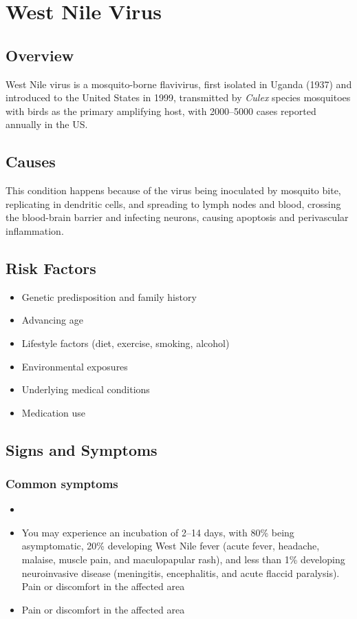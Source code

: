 \chapter{West Nile Virus}
\label{sec:West Nile Virus}

\section{Overview}
West Nile virus is a mosquito-borne flavivirus, first isolated in Uganda (1937) and introduced to the United States in 1999, transmitted by \textit{Culex} species mosquitoes with birds as the primary amplifying host, with 2000--5000 cases reported annually in the US.
\section{Causes}
This condition happens because of the virus being inoculated by mosquito bite, replicating in dendritic cells, and spreading to lymph nodes and blood, crossing the blood-brain barrier and infecting neurons, causing apoptosis and perivascular inflammation.     
\section{Risk Factors}

\begin{itemize}[noitemsep]
  \item Genetic predisposition and family history
  \item Advancing age
  \item Lifestyle factors (diet, exercise, smoking, alcohol)
  \item Environmental exposures
  \item Underlying medical conditions
  \item Medication use
\end{itemize}
\section{Signs and Symptoms}

\subsection{Common symptoms}
\begin{itemize}[noitemsep]
  \item \item You may experience an incubation of 2--14 days, with 80\% being asymptomatic, 20\% developing West Nile fever (acute fever, headache, malaise, muscle pain, and maculopapular rash), and less than 1\% developing neuroinvasive disease (meningitis, encephalitis, and acute flaccid paralysis). Pain or discomfort in the affected area    \item Pain or discomfort in the affected area
  \end{itemize}

